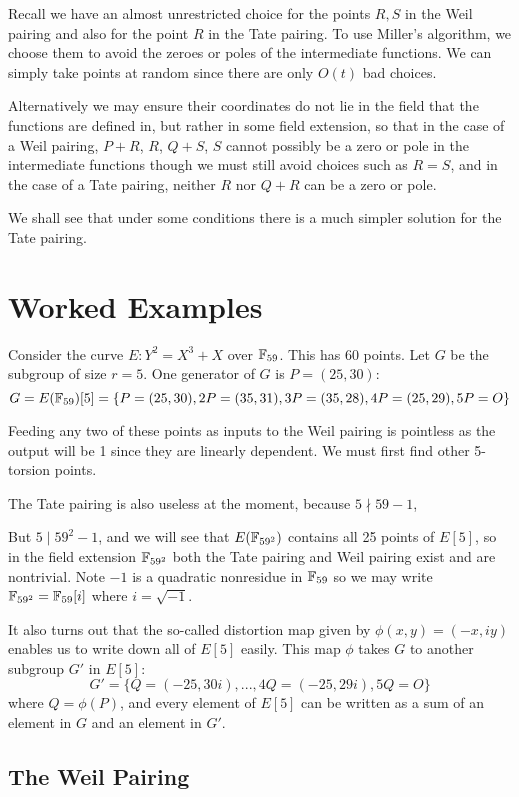 Recall we have an almost unrestricted choice for the points $R, S$ in
the Weil pairing and also for the point $R$
in the Tate pairing. To use Miller's algorithm, we choose them
to avoid the zeroes or poles
of the intermediate functions. We can simply
take points at random since there are only $O(t)$ bad choices.

Alternatively we may ensure their coordinates do not lie in the
field that the functions are defined in, but rather in some field
extension, so that in the case of a Weil pairing, $P+R$, $R$, $Q+S$, $S$
cannot possibly be a zero or pole in the intermediate functions
though we must still avoid choices such as $R = S$,
and in the case of a Tate pairing, neither $R$ nor $Q + R$
can be a zero or pole.

We shall see that under some conditions there is a much simpler solution
for the Tate pairing.

\section {Worked Examples}

Consider the curve $E : Y^2 = X^3 + X$ over $\mathbb{F}_{59}$.
This has 60 points. Let $G$ be the subgroup of size $r = 5$.
One generator of $G$ is $P = (25, 30)$:
\[ G =
E(\mathbb{F}_{59})[5] =
\{P = (25, 30), 2P = (35, 31), 3P = (35, 28), 4P = (25, 29), 5P = O \} \]

Feeding any two of these points as inputs to the Weil pairing is pointless
as the output will be 1 since they are linearly dependent. We must first
find other 5-torsion points.

The Tate pairing is also useless at the moment, because $5 \nmid 59 - 1$,

But $5 \mid 59^2 - 1$, and we will see that $E(\mathbb{F}_{59^2})$ contains
all 25 points of $E[5]$, so in the field extension $\mathbb{F}_{59^2}$
both the Tate pairing
and Weil pairing exist and are nontrivial.
Note $-1$ is a quadratic nonresidue in $\mathbb{F}_{59}$
so we may write $\mathbb{F}_{59^2} = \mathbb{F}_{59}[i]$ where $i = \sqrt{-1}$.

It also turns out that the so-called distortion map given by
$\phi(x,y) = (-x, i y)$ enables us to write down all of $E[5]$ easily.
This map $\phi$ takes $G$ to another subgroup $G'$ in $E[5]$:
\[ G' =
\{Q = (-25, 30i), ..., 4Q = (-25, 29i), 5Q = O \} \]
where $Q = \phi(P)$,
and every element of $E[5]$ can be written as a sum of an element in $G$
and an element in $G'$.

\subsection {The Weil Pairing}

